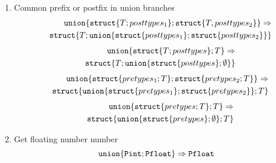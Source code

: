 \documentclass[fleqn]{article}
\newcommand{\struct}[1]{{\tt struct}\{#1\}}
\newcommand{\union}[1]{{\tt union}\{#1\}}
\newcommand{\goto}{\Rightarrow}
\begin{document}
\begin{enumerate}
\item Common prefix or postfix in union branches
\begin{eqnarray*}
&&\union{\struct{T; posttypes_1}; \struct{T, posttypes_2}} \goto \\
&&\struct{T; \union{\struct{posttypes_1}; \struct{posttypes_2}}}
\end{eqnarray*}
\begin{eqnarray*}
&&\union{\struct{T; posttypes}; T} \goto \\
&&\struct{T; \union{\struct{posttypes}; \emptyset}}
\end{eqnarray*}
\begin{eqnarray*}
&&\union{\struct{pretypes_1; T}; \struct{pretypes_2; T}} \goto \\
&&\struct{\union{\struct{pretypes_1}; \struct{pretypes_2}}; T}
\end{eqnarray*}
\begin{eqnarray*}
&&\union{\struct{pretypes; T}; T} \goto \\
&&\struct{\union{\struct{pretypes}; \emptyset}; T}
\end{eqnarray*}

\item {Get floating number number}
\[
\union{{\tt Pint}; {\tt Pfloat}} \goto {\tt Pfloat}
\]

\end{enumerate}
\end{document}
